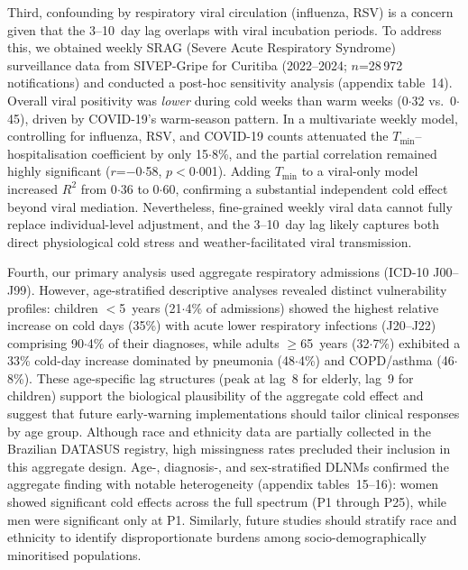 \documentclass[review,number]{elsarticle}
\begin{document}
Third, confounding by respiratory viral circulation (influenza, RSV)
is a concern given that the 3--10~day lag overlaps with viral
incubation periods. To address this, we obtained weekly SRAG
(Severe Acute Respiratory Syndrome) surveillance data from
SIVEP-Gripe for Curitiba (2022--2024; $n$=28\,972 notifications)
and conducted a post-hoc sensitivity analysis (appendix table~14).
Overall viral positivity was \emph{lower} during cold weeks than
warm weeks (0${\cdot}$32 vs.\ 0${\cdot}$45), driven by COVID-19's
warm-season pattern. In a multivariate weekly model, controlling for
influenza, RSV, and COVID-19 counts attenuated the
$T_\mathrm{min}$--hospitalisation coefficient by only
15${\cdot}$8\%, and the partial correlation remained highly
significant ($r$=$-$0${\cdot}$58, $p$$<$0${\cdot}$001). Adding
$T_\mathrm{min}$ to a viral-only model increased $R^2$ from
0${\cdot}$36 to 0${\cdot}$60, confirming a substantial independent
cold effect beyond viral mediation. Nevertheless, fine-grained
weekly viral data cannot fully replace individual-level adjustment,
and the 3--10~day lag likely captures both direct physiological
cold stress and weather-facilitated viral transmission.

Fourth, our primary analysis used aggregate respiratory admissions
(ICD-10 J00--J99). However, age-stratified descriptive analyses
revealed distinct vulnerability profiles: children $<$5~years
(21${\cdot}$4\% of admissions) showed the highest relative increase
on cold days (35\%) with acute lower respiratory infections
(J20--J22) comprising 90${\cdot}$4\% of their diagnoses, while
adults $\geq$65~years (32${\cdot}$7\%) exhibited a 33\% cold-day
increase dominated by pneumonia (48${\cdot}$4\%) and COPD/asthma
(46${\cdot}$8\%). These age-specific lag structures (peak at lag~8
for elderly, lag~9 for children) support the biological plausibility
of the aggregate cold effect and suggest that future early-warning
implementations should tailor clinical responses by age group.
Although race and ethnicity data are partially collected in the
Brazilian DATASUS registry, high missingness rates precluded their
inclusion in this aggregate design. Age-, diagnosis-, and sex-stratified DLNMs confirmed the aggregate
finding with notable heterogeneity (appendix tables~15--16): women
showed significant cold effects across the full spectrum
(P1 through P25), while men were significant only at P1. Similarly, future studies should stratify race and
ethnicity to identify disproportionate burdens among
socio-demographically minoritised populations.
\end{document}
